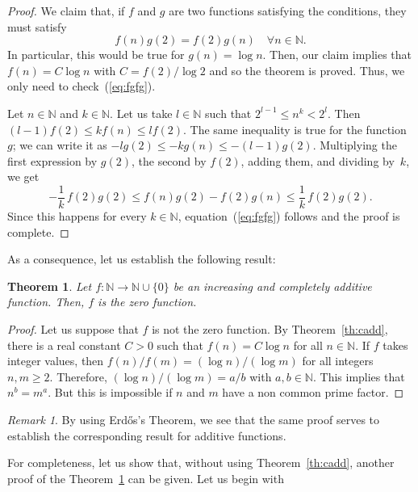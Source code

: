 \documentclass[12pt,a4paper]{amsart}
\newcommand{\N}{\mathbb{N}}
\newtheorem{theorem}{Theorem}
\theoremstyle{remark}
\newtheorem*{rem}{Remark}
\begin{document}
\begin{proof}
We claim that, if $f$ and $g$ are two functions
satisfying the conditions, they must satisfy
\begin{equation}
\label{eq:fgfg}
  f(n)g(2) = f(2)g(n)\quad \forall n \in \N.
\end{equation} 
In particular, this would be true for $g(n) = \log n$.
Then, our claim implies that $f(n) = C \log n$ with $C = f(2)/\log 2$
and so the theorem is proved. Thus, we only need to check~(\ref{eq:fgfg}).

Let $n \in \N$ and $k\in\N$. Let us take $l\in \N$ such that
$2^{l-1} \le n^k < 2^l$. Then $(l-1)f(2) \le k f(n) \le lf(2)$.
The same inequality is true for the function~$g$; we can write it as
$-lg(2) \le -k g(n) \le -(l-1)g(2)$.
Multiplying the first expression by $g(2)$, the second by $f(2)$,
adding them, and dividing by~$k$, we get
$$
  -\frac{1}{k}\,f(2)g(2) \le f(n)g(2) - f(2)g(n) \le \frac{1}{k}\,f(2)g(2).
$$
Since this happens for every $k\in\N$, equation~(\ref{eq:fgfg}) follows
and the proof is complete.
\end{proof}

As a consequence, let us establish the following result:

\begin{theorem}
\label{th:NN0}
Let $f \colon \N \to \N \cup \{0\}$ be an increasing and completely additive
function. Then, $f$ is the zero function.
\end{theorem}

\begin{proof}
Let us suppose that $f$ is not the zero function.
By Theorem~\ref{th:cadd}, there is a real constant $C>0$ 
such that $f(n) = C\log n$ for all $n \in \N$.
If $f$ takes integer values, then
$f(n)/f(m) = (\log n) / (\log m)$ for all integers $n, m \ge 2$.
Therefore, $(\log n) / (\log m) = a/b$ with $a, b \in \N$.
This implies that $n^b = m^a$. But this is impossible if $n$ and $m$ 
have a non common prime factor. 
\end{proof}

\begin{rem}
By using Erd\H{o}s's Theorem, we see that the same proof serves to 
establish the corresponding result for additive functions.
\end{rem}

For completeness, let us show that, without using Theorem~\ref{th:cadd}, another
proof of the Theorem~\ref{th:NN0} can be given. Let us begin with
\end{document}
